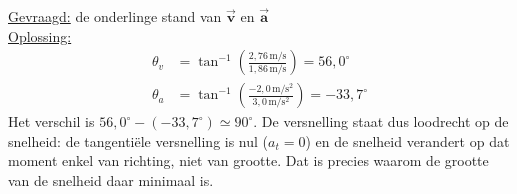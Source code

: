 \documentclass{ximera}
\begin{document}
\begin{exercise}
\begin{question}
\begin{solution}
            \underline{Gevraagd:} de onderlinge stand van $\vec{\mathbf{v}}$ en $\vec{\mathbf{a}}$\\

            \underline{Oplossing:}\\
            \begin{align*}
                \theta_v &= \tan^{-1}\left(\frac{2{,}76 \, \mathrm{m/s}}{1{,}86 \, \mathrm{m/s}}\right) = 56{,}0^\circ\\
                \theta_a &= \tan^{-1}\left(\frac{-2{,}0 \, \mathrm{m/s^2}}{3{,}0 \, \mathrm{m/s^2}}\right) = -33{,}7^\circ
            \end{align*}
            Het verschil is $56{,}0^\circ - (-33{,}7^\circ) \simeq 90^\circ$. De versnelling staat dus loodrecht op de snelheid: de tangentiële versnelling is nul ($a_t = 0$) en de snelheid verandert op dat moment enkel van richting, niet van grootte. Dat is precies waarom de grootte van de snelheid daar minimaal is.
        \end{solution}
    \end{question}
\end{exercise}
\end{document}

